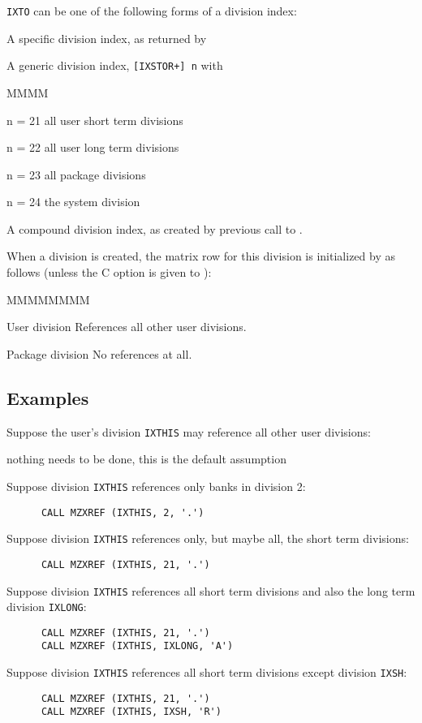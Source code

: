 \par
{\tt IXTO} can be one of the following forms of a division index:
\begin{OL}
\item A specific division index, as returned by 
\item A generic division index, {\tt[IXSTOR+] n} with
\begin{DL}{MMMM}
\item[n = 21]all user short term divisions
\item[n = 22]all user long  term divisions
\item[n = 23]all package divisions
\item[n = 24]the system division
\end{DL}
\item A compound division index, as created by previous call to .
\end{OL}
When a division is created, the matrix row for this division
is initialized by 
as follows (unless the C option is given to ):
\begin{DL}{MMMMMMMM}
\item[User division]References all other user divisions.
\item[Package division]No references at all.
\end{DL}
\subsection{Examples}
\par
\begin{OL}
\item Suppose the user's division {\tt IXTHIS} may reference
all other user divisions:
\par
\phantom{\tt\      }nothing needs to be done, this is the default assumption 
\item Suppose division {\tt IXTHIS} references
only banks in division 2:
\begin{verbatim}
      CALL MZXREF (IXTHIS, 2, '.')
\end{verbatim}
\item Suppose division {\tt IXTHIS} references only,
but maybe all, the short term divisions:
\begin{verbatim}
      CALL MZXREF (IXTHIS, 21, '.')
\end{verbatim}
\item Suppose division {\tt IXTHIS} references all short term
divisions and also the long term division {\tt IXLONG}:
\begin{verbatim}
      CALL MZXREF (IXTHIS, 21, '.')
      CALL MZXREF (IXTHIS, IXLONG, 'A')
\end{verbatim}
\item Suppose division {\tt IXTHIS} references all short term
divisions except division {\tt IXSH}:
\begin{verbatim}
      CALL MZXREF (IXTHIS, 21, '.')
      CALL MZXREF (IXTHIS, IXSH, 'R')
\end{verbatim}
\end{OL}
